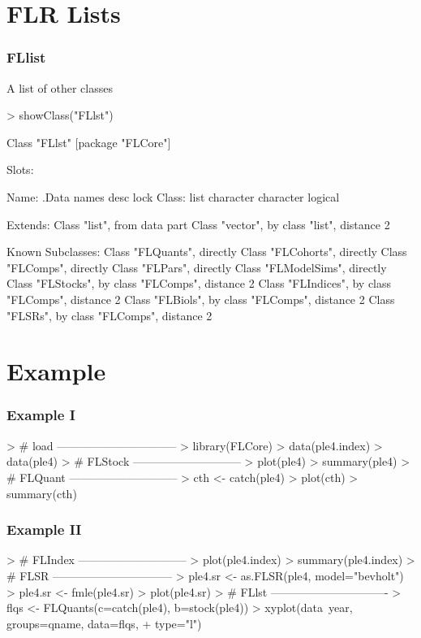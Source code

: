 \documentclass{beamer}%
\begin{document}
\section{FLR Lists}
\begin{frame}[containsverbatim]
  \frametitle{FLlist}
A list of other classes
{\scriptsize{
\begin{Schunk}
\begin{Sinput}
> showClass("FLlst")
\end{Sinput}
\begin{Soutput}
Class "FLlst" [package "FLCore"]

Slots:
                                              
Name:      .Data     names      desc      lock
Class:      list character character   logical

Extends: 
Class "list", from data part
Class "vector", by class "list", distance 2

Known Subclasses: 
Class "FLQuants", directly
Class "FLCohorts", directly
Class "FLComps", directly
Class "FLPars", directly
Class "FLModelSims", directly
Class "FLStocks", by class "FLComps", distance 2
Class "FLIndices", by class "FLComps", distance 2
Class "FLBiols", by class "FLComps", distance 2
Class "FLSRs", by class "FLComps", distance 2
\end{Soutput}
\end{Schunk}
}}

\end{frame}

\section{Example}
\begin{frame}[containsverbatim]
  \frametitle{Example I}
\begin{Schunk}
\begin{Sinput}
> # load --------------------------------
> library(FLCore)
> data(ple4.index)
> data(ple4)
> # FLStock -----------------------------
> plot(ple4)
> summary(ple4)
> # FLQuant -----------------------------
> cth <- catch(ple4)
> plot(cth)
> summary(cth)
\end{Sinput}
\end{Schunk}
\end{frame}

\begin{frame}[containsverbatim]
  \frametitle{Example II}
\begin{Schunk}
\begin{Sinput}
> # FLIndex -----------------------------
> plot(ple4.index)
> summary(ple4.index)
> # FLSR --------------------------------
> ple4.sr <- as.FLSR(ple4, model="bevholt")
> ple4.sr <- fmle(ple4.sr)
> plot(ple4.sr)
> # FLlst -------------------------------
> flqs <- FLQuants(c=catch(ple4), b=stock(ple4))
> xyplot(data~year, groups=qname, data=flqs, 
+ 	 type="l")
\end{Sinput}
\end{Schunk}
\end{frame}
\end{document}
